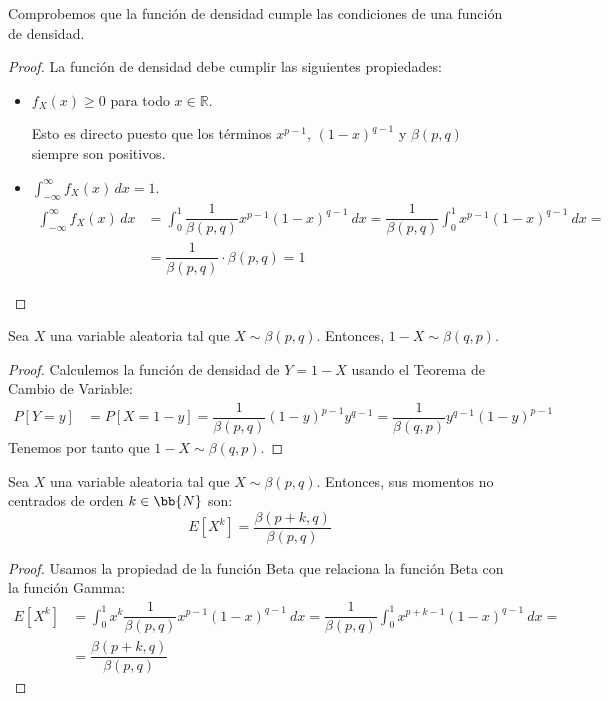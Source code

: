 Comprobemos que la función de densidad cumple las condiciones de una función de densidad.
\begin{proof}
    La función de densidad debe cumplir las siguientes propiedades:
    \begin{itemize}
        \item $f_X(x)\geq 0$ para todo $x\in \mathbb{R}$.
        
        Esto es directo puesto que los términos $x^{p-1}$, $(1-x)^{q-1}$ y $\beta(p,q)$ siempre son positivos.
        
        \item $\displaystyle \int_{-\infty}^{\infty} f_X(x) \, dx = 1$.
        \begin{align*}
            \int_{-\infty}^{\infty} f_X(x) \, dx &= \int_{0}^{1} \dfrac{1}{\beta(p,q)}x^{p-1}(1-x)^{q-1}~dx
            = \dfrac{1}{\beta(p,q)} \int_{0}^{1} x^{p-1}(1-x)^{q-1}~dx
            =\\& = \dfrac{1}{\beta(p,q)}\cdot \beta(p,q) = 1
        \end{align*}
    \end{itemize}
\end{proof}

\begin{prop}[Simetría]
    Sea $X$ una variable aleatoria tal que $X\sim \beta(p,q)$. Entonces, $1-X\sim \beta(q,p)$.
\end{prop}
\begin{proof}
    Calculemos la función de densidad de $Y=1-X$ usando el Teorema de Cambio de Variable:
    \begin{align*}
        P[Y=y] &= P[X=1-y] = \dfrac{1}{\beta(p,q)}(1-y)^{p-1}y^{q-1}
        = \dfrac{1}{\beta(q,p)}y^{q-1}(1-y)^{p-1}
    \end{align*}
    Tenemos por tanto que $1-X\sim \beta(q,p)$.
\end{proof}


\begin{prop}
    Sea $X$ una variable aleatoria tal que $X\sim \beta(p,q)$. Entonces, sus momentos no centrados de orden $k\in \bb{N}$ son:
    \begin{equation*}
        E[X^k] = \dfrac{\beta(p+k,q)}{\beta(p,q)}
    \end{equation*}
\end{prop}
\begin{proof}
    Usamos la propiedad de la función Beta que relaciona la función Beta con la función Gamma:
    \begin{align*}
        E[X^k] &= \int_{0}^{1} x^k \dfrac{1}{\beta(p,q)}x^{p-1}(1-x)^{q-1}~dx
        = \dfrac{1}{\beta(p,q)} \int_{0}^{1} x^{p+k-1}(1-x)^{q-1}~dx
        =\\&= \dfrac{\beta(p+k,q)}{\beta(p,q)}
    \end{align*}
\end{proof}

